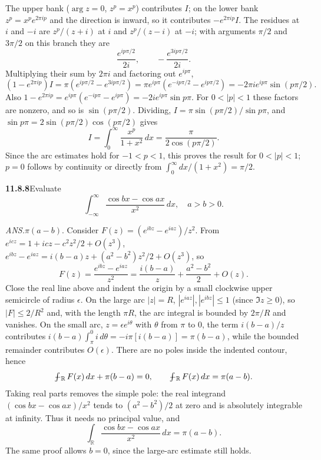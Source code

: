 The upper bank ($\arg z=0$, $z^p=x^p$) contributes $I$; on the lower
bank $z^p=x^pe^{2\pi ip}$ and the direction is inward, so it
contributes $-e^{2\pi ip}I$. The residues at $i$ and $-i$ are
$z^p/(z+i)$ at $i$ and $z^p/(z-i)$ at $-i$; with arguments
$\pi/2$ and $3\pi/2$ on this branch they are
\[
\frac{e^{ip\pi/2}}{2i},\qquad
-\frac{e^{3ip\pi/2}}{2i}.
\]
Multiplying their sum by $2\pi i$ and factoring out $e^{ip\pi}$,
\[
(1-e^{2\pi ip})I
=\pi(e^{ip\pi/2}-e^{3ip\pi/2})
=\pi e^{ip\pi}(e^{-ip\pi/2}-e^{ip\pi/2})
=-2\pi i e^{ip\pi}\sin(p\pi/2).
\]
Also $1-e^{2\pi ip}=e^{ip\pi}(e^{-ip\pi}-e^{ip\pi})
=-2ie^{ip\pi}\sin p\pi$.
For $0<|p|<1$ these factors are nonzero, and so is $\sin(p\pi/2)$.
Dividing,
$I=\pi\sin(p\pi/2)/\sin p\pi$, and
$\sin p\pi=2\sin(p\pi/2)\cos(p\pi/2)$ gives
\[
\boxed{I=\int_0^\infty\frac{x^p}{1+x^2}\,dx
=\frac{\pi}{2\cos(p\pi/2)}}.
\]
Since the arc estimates hold for $-1<p<1$, this proves the result for
$0<|p|<1$; $p=0$ follows by continuity or directly from
$\int_0^\infty dx/(1+x^2)=\pi/2$.

\par\bigskip
\noindent\textbf{11.8.8}\quad Evaluate
\[
\int_{-\infty}^{\infty}\frac{\cos bx-\cos ax}{x^{2}}\,dx,\quad a>b>0.
\]
\par\nobreak\hfill\emph{ANS.}\enspace $\pi(a-b)$.
\solution
Consider $F(z)=(e^{ibz}-e^{iaz})/z^2$. From
$e^{icz}=1+icz-c^2z^2/2+O(z^3)$,
$e^{ibz}-e^{iaz}=i(b-a)z+(a^2-b^2)z^2/2+O(z^3)$, so
\[
F(z)=\frac{e^{ibz}-e^{iaz}}{z^2}
=\frac{i(b-a)}z+\frac{a^2-b^2}{2}+O(z).
\]
Close the real line above and indent the origin by a small clockwise
upper semicircle of radius $\epsilon$. On the large arc $|z|=R$,
$|e^{iaz}|,|e^{ibz}|\le1$ (since $\Im z\ge0$), so $|F|\le2/R^2$ and,
with the length $\pi R$, the arc integral is bounded by $2\pi/R$ and
vanishes. On the small arc, $z=\epsilon e^{i\theta}$ with $\theta$ from
$\pi$ to $0$, the term $i(b-a)/z$ contributes
$i(b-a)\int_\pi^0i\,d\theta=-i\pi[i(b-a)]=\pi(b-a)$, while the bounded
remainder contributes $O(\epsilon)$. There are no poles inside
the indented contour, hence
\[
\PVint_{\mathbb R}F(x)\,dx+\pi(b-a)=0,\qquad
\PVint_{\mathbb R}F(x)\,dx=\pi(a-b).
\]
Taking real parts removes the simple pole: the real integrand
$(\cos bx-\cos ax)/x^2$ tends to $(a^2-b^2)/2$ at zero and is
absolutely integrable at infinity. Thus it needs no principal value,
and
\[
\boxed{\int_{\mathbb R}\frac{\cos bx-\cos ax}{x^2}\,dx
=\pi(a-b)}.
\]
The same proof allows $b=0$, since the large-arc estimate still holds.

